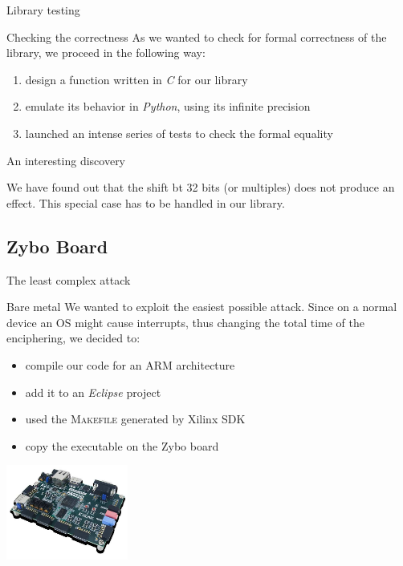 \documentclass{beamer}
\begin{document}
\begin{frame}{Library testing}
  \begin{block}{Checking the correctness}
    As we wanted to check for formal correctness of the library, we proceed in the following way:
    \begin{enumerate}
      \pause \item design a function written in \textit{C} for our library
      \pause \item emulate its behavior in \textit{Python}, using its infinite precision
      \pause \item launched an intense series of tests to check the formal equality
    \end{enumerate}
  \end{block}

  \pause
  \begin{alert}{An interesting discovery}

    We have found out that the shift bt 32 bits (or multiples) does not produce an effect. This special case has to be handled in our library.
  \end{alert}
\end{frame}

\subsection{Zybo Board}
\begin{frame}{The least complex attack}
	\begin{block}{Bare metal}
		We wanted to exploit the easiest possible attack. Since on a normal device an OS might cause interrupts, thus changing the total time of the enciphering, we decided to:
		\begin{itemize}
			\pause \item compile our code for an ARM architecture
			\pause \item add it to an \textit{Eclipse} project
			\pause \item used the \textsc{Makefile} generated by Xilinx SDK
			\pause \item copy the executable on the Zybo board
		\end{itemize}
    \begin{center}
      \includegraphics[width=4cm]{./graphics/zybo}
    \end{center}
	\end{block}
\end{frame}
\end{document}
